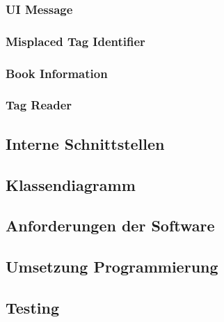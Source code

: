 \subsubsection{UI Message}
\subsubsection{Misplaced Tag Identifier}
\subsubsection{Book Information}
\subsubsection{Tag Reader}

\subsection{Interne Schnittstellen}

\subsection{Klassendiagramm}

\subsection{Anforderungen der Software}

\subsection{Umsetzung Programmierung}

\subsection{Testing}
